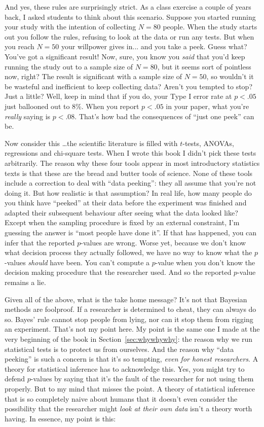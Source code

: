 And yes, these rules are surprisingly strict. As a class exercise a couple of years back, I asked students to think about this scenario. Suppose you started running your study with the intention of collecting $N=80$ people. When the study starts out you follow the rules, refusing to look at the data or run any tests. But when you reach $N=50$ your willpower gives in... and you take a peek. Guess what? You've got a significant result! Now, sure, you know you {\it said} that you'd keep running the study out to a sample size of $N=80$, but it seems sort of pointless now, right? The result is significant with a sample size of $N=50$, so wouldn't it be wasteful and inefficient to keep collecting data? Aren't you tempted to stop? Just a little? Well, keep in mind that if you do, your Type I error rate at $p<.05$ just ballooned out to 8\%. When you report $p<.05$ in your paper, what you're {\it really} saying is $p<.08$. That's how bad the consequences of ``just one peek'' can be.

Now consider this \ldots the scientific literature is filled with $t$-tests, ANOVAs, regressions and chi-square tests. When I wrote this book I didn't pick these tests arbitrarily. The reason why these four tools appear in most introductory statistics texts is that these are the bread and butter tools of science. None of these tools include a correction to deal with ``data peeking'': they all assume that you're not doing it. But how realistic is that assumption? In real life, how many people do you think have ``peeked'' at their data before the experiment was finished and adapted their subsequent behaviour after seeing what the data looked like? Except when the sampling procedure is fixed by an external constraint, I'm guessing the answer is ``most people have done it''. If that has happened, you can infer that the reported $p$-values are wrong. Worse yet, because we don't know what decision process they actually followed, we have no way to know what the $p$-values {\it should} have been. You can't compute a $p$-value when you don't know the decision making procedure that the researcher used. And so the reported $p$-value remains a lie. 

Given all of the above, what is the take home message? It's not that Bayesian methods are foolproof. If a researcher is determined to cheat, they can always do so. Bayes' rule cannot stop people from lying, nor can it stop them from rigging an experiment. That's not my point here. My point is the same one I made at the very beginning of the book in Section~\ref{sec:whywhywhy}: the reason why we run statistical tests is to protect us from ourselves. And the reason why ``data peeking'' is such a concern is that it's so tempting, {\it even for honest researchers}. A theory for statistical inference has to acknowledge this. Yes, you might try to defend $p$-values by saying that it's the fault of the researcher for not using them properly. But to my mind that misses the point. A theory of statistical inference that is so completely naive about humans that it doesn't even consider the possibility that the researcher might {\it look at their own data} isn't a theory worth having. In essence, my point is this:


